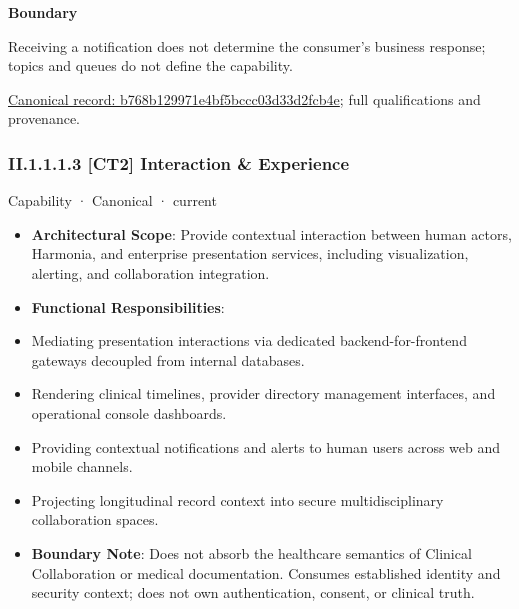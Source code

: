 \textbf{Boundary}



Receiving a notification does not determine the consumer's business response; topics and queues do not define the capability.


{\footnotesize \href{../../../../continuum/strategy/capability/b768b129971e4bf5bccc03d33d2fcb4e.md}{Canonical record: b768b129971e4bf5bccc03d33d2fcb4e}; full qualifications and provenance.}\par
\subsubsection*{II.1.1.1.3 [CT2] Interaction \& Experience}
\label{navigation:II.1.1.1.3}

\label{element:4ec9757b1c6947b4b70b0f1159b760d3}
{\small Capability · Canonical · current}\par

\begin{itemize}


\item \textbf{Architectural Scope}: Provide contextual interaction between human actors, Harmonia, and enterprise presentation services, including visualization, alerting, and collaboration integration.

\item \textbf{Functional Responsibilities}:

\item Mediating presentation interactions via dedicated backend-for-frontend gateways decoupled from internal databases.

\item Rendering clinical timelines, provider directory management interfaces, and operational console dashboards.

\item Providing contextual notifications and alerts to human users across web and mobile channels.

\item Projecting longitudinal record context into secure multidisciplinary collaboration spaces.

\item \textbf{Boundary Note}: Does not absorb the healthcare semantics of Clinical Collaboration or medical documentation. Consumes established identity and security context; does not own authentication, consent, or clinical truth.

\end{itemize}


